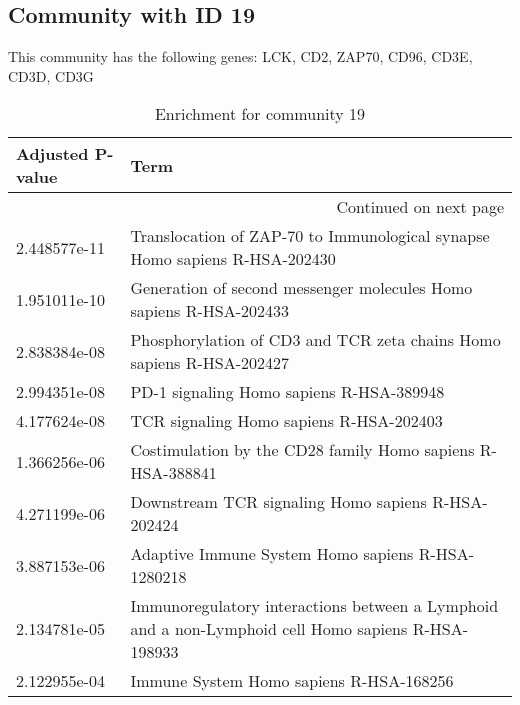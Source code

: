 \subsection*{Community with ID 19}
This community has the following genes: LCK, CD2, ZAP70, CD96, CD3E, CD3D, CD3G
\\
\begin{longtable}{p{2.4cm}p{14.5cm}}
\caption{Enrichment for community 19}\\
\toprule
Adjusted \newline P-value &                                                                                                Term \\
\midrule
\endhead
\midrule
\multicolumn{2}{r}{{Continued on next page}} \\
\midrule
\endfoot

\bottomrule
\endlastfoot
             2.448577e-11 &                          Translocation of ZAP-70 to Immunological synapse Homo sapiens R-HSA-202430 \\
             1.951011e-10 &                                  Generation of second messenger molecules Homo sapiens R-HSA-202433 \\
             2.838384e-08 &                                Phosphorylation of CD3 and TCR zeta chains Homo sapiens R-HSA-202427 \\
             2.994351e-08 &                                                            PD-1 signaling Homo sapiens R-HSA-389948 \\
             4.177624e-08 &                                                             TCR signaling Homo sapiens R-HSA-202403 \\
             1.366256e-06 &                                          Costimulation by the CD28 family Homo sapiens R-HSA-388841 \\
             4.271199e-06 &                                                  Downstream TCR signaling Homo sapiens R-HSA-202424 \\
             3.887153e-06 &                                                   Adaptive Immune System Homo sapiens R-HSA-1280218 \\
             2.134781e-05 &  Immunoregulatory interactions between a Lymphoid and a non-Lymphoid cell Homo sapiens R-HSA-198933 \\
             2.122955e-04 &                                                             Immune System Homo sapiens R-HSA-168256 \\
\end{longtable}



